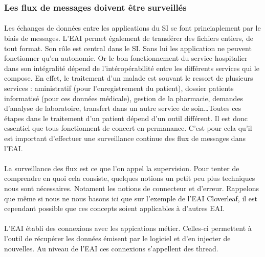 		\subsubsection{Les flux de messages doivent être surveillés}
			\paragraph{}%
			Les échanges de données entre les applications du SI se font
			princiaplement par le biais de messages. L'EAI permet également de transférer
			des fichiers entiers, de tout format. Son rôle est central dans le SI. Sans
			lui les application ne peuvent fonctionner qu'en autonomie. Or le bon
			fonctionnement du service hospitalier dans son intégralité dépend de
			l'intéropérabilité entre les différents services qui le compose. En effet, le
			traitement d'un malade est souvant le ressort de plusieurs services :
			aministratif (pour l'enregistrement du patient), dossier patients informatisé
			(pour ces données médicale), gestion de la pharmacie, demandes d'analyse de
			laboratoire, transfert dans un autre service de soin\ldots Toutes ces étapes
			dans le traitement d'un patient dépend d'un outil différent. Il est donc
			essentiel que tous fonctionnent de concert en permanance. C'est pour cela
			qu'il est important d'effectuer une surveillance continue des flux de
			messages dans l'EAI.
			
			\paragraph{}%
			La surveillance des flux est ce que l'on appel la supervision. Pour tenter de
			comprendre en quoi cela consiste, quelques notions un petit peu plus
			techniques nous sont nécessaires. Notament les notions de connecteur et
			d'erreur. Rappelons que même si nous ne nous basons ici que sur l'exemple de
			l'EAI Cloverleaf, il est cependant possible que ces concepts soient
			applicables à d'autres EAI.
			
			\paragraph{}%
			L'EAI établi des connexions avec les appications métier. Celles-ci
			permettent à l'outil de récupérer les données émisent par le logiciel et d'en
			injecter de nouvelles. Au niveau de l'EAI ces connexions s'appellent des
			thread.
			
